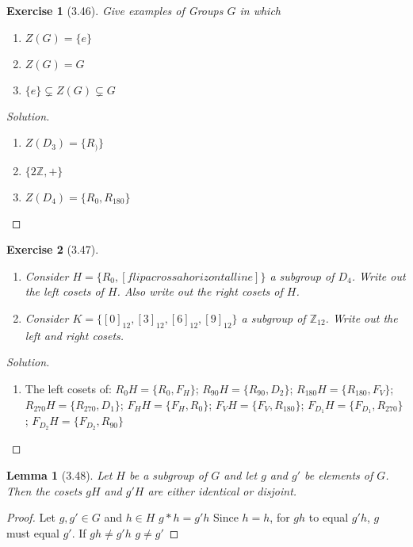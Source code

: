 \documentclass{article}
\newtheorem*{ex}{Exercise}
\newtheorem{lem}{Lemma}
\newenvironment{solution}
  {\begin{proof}[Solution]}
  {\renewcommand{\qedsymbol}{}\end{proof}}
\begin{document}
\begin{ex}[3.46]
	Give examples of Groups $G$ in which \begin{enumerate}
	  \item $Z(G) = \{e\}$
	  \item $Z(G) = G$
	  \item $\{e\} \subsetneq Z(G) \subsetneq G$
	    \end{enumerate}
\end{ex}
\begin{solution}
  \begin{enumerate}
    \item $Z(D_3) = \{R_)\}$
    \item $\{2\mathbb{Z}, +\}$
    \item $Z(D_4) = \{R_0, R_{180}\}$
  \end{enumerate}
\end{solution}


\begin{ex}[3.47]
	\begin{enumerate}
	  \item Consider $H = \{R_0, [flip across a horizontal line]\}$ a subgroup of $D_4$. Write out the left cosets of $H$. Also write out 
	    the right cosets of  $H$.
	  \item Consider $K=\{[0]_{12}, [3]_{12}, [6]_{12}, [9]_{12}\}$ a subgroup of $\mathbb{Z}_{12}$. Write out the left and right cosets.
	\end{enumerate}	
 \end{ex}
\begin{solution}
	\begin{enumerate}
	  \item The left cosets of: $R_0H = \{R_0, F_H\}$; $R_{90}H = \{R_{90}, D_2\}$; $R_{180}H = \{R_{180}, F_V\}$; $R_{270}H = \{R_{270}, D_1\}$;
	    $F_HH = \{F_H, R_0\}$; $F_VH = \{F_V, R_{180}\}$; $F_{D_1}H = \{F_{D_1}, R_{270}\}$; $F_{D_2}H = \{F_{D_2}, R_{90}\}$

	\end{enumerate}
	  
\end{solution}

\begin{lem}[3.48]
	Let $H$ be a subgroup of $G$ and let $g$ and $g\prime$ be elements of $G$. Then the cosets $gH$ and $g\prime H$ are either identical or disjoint.
\end{lem}
\begin{proof}
	Let $g, g\prime \in G$ and $h\in H$ $g*h = g\prime h$ Since $h=h$, for $gh$ to equal $g\prime h$, $g$ must equal $g\prime$. If $gh \neq g\prime h$
	$g\neq g\prime$
\end{proof}
\end{document}
